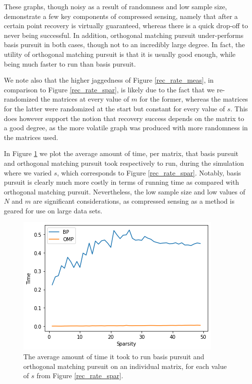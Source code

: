 \documentclass[12pt,a4paper]{amsart}
\numberwithin{equation}{section}
\theoremstyle{plain}
\theoremstyle{definition}
\begin{document}
These graphs, though noisy as a result of randomness and low sample size, demonstrate a few key components of compressed sensing, namely that after a certain point recovery is virtually guaranteed, whereas there is a quick drop-off to never being successful. In addition, orthogonal matching pursuit under-performs basis pursuit in both cases, though not to an incredibly large degree. In fact, the utility of orthogonal matching pursuit is that it is usually good enough, while being much faster to run than basis pursuit.

We note also that the higher jaggedness of Figure \ref{rec_rate_meas}, in comparison to Figure \ref{rec_rate_spar}, is likely due to the fact that we re-randomized the matrices at every value of $m$ for the former, whereas the matrices for the latter were randomized at the start but constant for every value of $s$. This does however support the notion that recovery success depends on the matrix to a good degree, as the more volatile graph was produced with more randomness in the matrices used.

In Figure \ref{bp_omp_time} we plot the average amount of time, per matrix, that basis pursuit and orthogonal matching pursuit took respectively to run, during the simulation where we varied $s$, which corresponds to Figure \ref{rec_rate_spar}. Notably, basis pursuit is clearly much more costly in terms of running time as compared with orthogonal matching pursuit. Nevertheless, the low sample size and low values of $N$ and $m$ are significant considerations, as compressed sensing as a method is geared for use on large data sets.

\begin{figure}
    \centering
    \includegraphics[scale = 0.7]{bp_omp_time_m_constant_final.png}
    \caption{The average amount of time it took to run basis pursuit and orthogonal matching pursuit on an individual matrix, for each value of $s$ from Figure \ref{rec_rate_spar}.}
    \label{bp_omp_time}
\end{figure}
\end{document}
